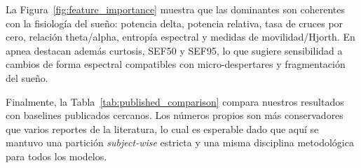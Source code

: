 La Figura~\ref{fig:feature_importance} muestra que las  dominantes son coherentes con la fisiolog\'ia del sue\~no: potencia delta, potencia relativa, tasa de cruces por cero, relaci\'on theta/alpha, entrop\'ia espectral y medidas de movilidad/Hjorth. En apnea destacan adem\'as curtosis, SEF50 y SEF95, lo que sugiere sensibilidad a cambios de forma espectral compatibles con micro-despertares y fragmentaci\'on del sue\~no.



Finalmente, la Tabla~\ref{tab:published_comparison} compara nuestros resultados con baselines publicados cercanos. Los n\'umeros propios son m\'as conservadores que varios reportes de la literatura, lo cual es esperable dado que aqu\'i se mantuvo una partici\'on \emph{subject-wise} estricta y una misma disciplina metodol\'ogica para todos los modelos.
